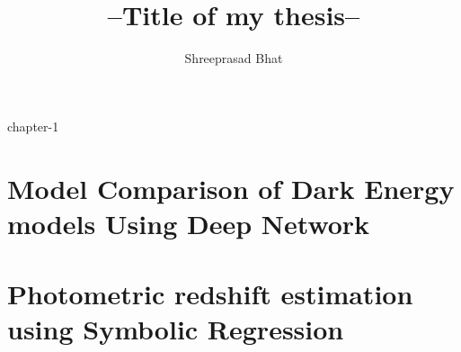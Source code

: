 \documentclass[a4paper,twoside]{iiththesis}
\title{--Title of my thesis--}
\author{Shreeprasad Bhat}
\begin{document}
\tableofcontents

{chapter-1}



\chapter{Model Comparison of Dark Energy models Using Deep Network}
\chapter{Photometric redshift estimation using Symbolic Regression}


\clearpage
\newpage
{} %
\end{document}
